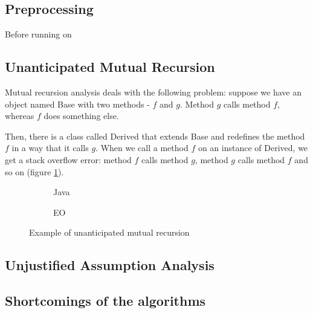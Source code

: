 \subsection{Preprocessing}
Before running on


\subsection{Unanticipated Mutual Recursion}
Mutual recursion analysis deals with the following problem: suppose we have an object named Base with two methods - $f$ and $g$. Method $g$ calls method $f$, whereas $f$ does something else.


Then, there is a class called Derived that extends Base and redefines the method $f$ in a way that it calls $g$. When we call a method $f$ on an instance of Derived, we get a stack overflow error: method $f$ calls method $g$, method $g$ calls method $f$ and so on (figure \ref{fig:mutualrec_basic}).


\begin{figure}
    \centering
    \begin{subfigure}{0.4\textwidth}
        
        \caption{Java}
    \end{subfigure}
    \hfill
    \begin{subfigure}{0.4\textwidth}
        
        \caption{EO}
    \end{subfigure}
    \caption{Example of unanticipated mutual recursion}
    \label{fig:mutualrec_basic}
\end{figure}

\subsection{Unjustified Assumption Analysis}

\subsection{Shortcomings of the algorithms}
